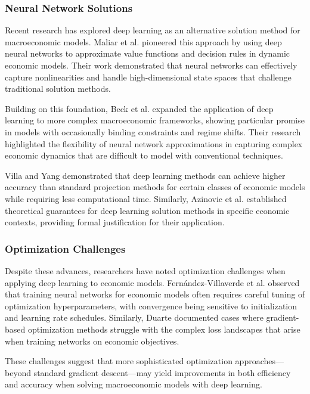 \documentclass[a4paper]{article}
\begin{document}
\subsubsection{Neural Network Solutions}
Recent research has explored deep learning as an alternative solution method for macroeconomic models. Maliar et al. \cite{maliar2021deep} pioneered this approach by using deep neural networks to approximate value functions and decision rules in dynamic economic models. Their work demonstrated that neural networks can effectively capture nonlinearities and handle high-dimensional state spaces that challenge traditional solution methods.

Building on this foundation, Beck et al. \cite{beck2024deep} expanded the application of deep learning to more complex macroeconomic frameworks, showing particular promise in models with occasionally binding constraints and regime shifts. Their research highlighted the flexibility of neural network approximations in capturing complex economic dynamics that are difficult to model with conventional techniques.

Villa and Yang \cite{villa2021solution} demonstrated that deep learning methods can achieve higher accuracy than standard projection methods for certain classes of economic models while requiring less computational time. Similarly, Azinovic et al. \cite{azinovic2022deep} established theoretical guarantees for deep learning solution methods in specific economic contexts, providing formal justification for their application.

\subsubsection{Optimization Challenges}
Despite these advances, researchers have noted optimization challenges when applying deep learning to economic models. Fernández-Villaverde et al. \cite{fernandez2020neural} observed that training neural networks for economic models often requires careful tuning of optimization hyperparameters, with convergence being sensitive to initialization and learning rate schedules. Similarly, Duarte \cite{duarte2018machine} documented cases where gradient-based optimization methods struggle with the complex loss landscapes that arise when training networks on economic objectives.

These challenges suggest that more sophisticated optimization approaches—beyond standard gradient descent—may yield improvements in both efficiency and accuracy when solving macroeconomic models with deep learning.
\end{document}
